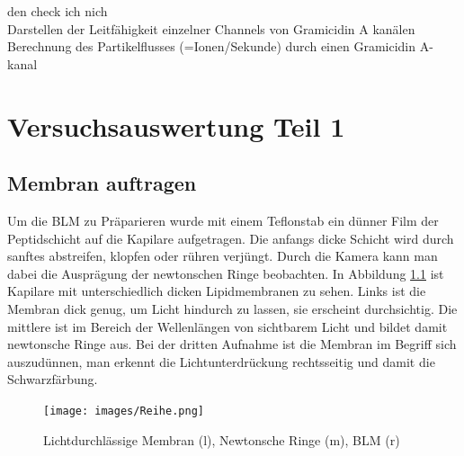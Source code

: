 \documentclass{include/thesisclass3}
\begin{document}
den check ich nich\\

Darstellen der Leitfähigkeit einzelner Channels von Gramicidin A kanälen\\

Berechnung des Partikelflusses (=Ionen/Sekunde) durch einen Gramicidin A-kanal



\chapter{Versuchsauswertung Teil 1}
\section{Membran auftragen}
Um die BLM zu Präparieren wurde mit einem Teflonstab ein dünner Film der Peptidschicht auf die Kapilare aufgetragen. Die anfangs dicke Schicht wird durch sanftes abstreifen, klopfen oder rühren verjüngt. Durch die Kamera kann man dabei die Ausprägung der newtonschen Ringe beobachten. In Abbildung \ref{Reihe} ist Kapilare mit unterschiedlich dicken Lipidmembranen zu sehen. Links ist die Membran dick genug, um Licht hindurch zu lassen, sie erscheint durchsichtig. Die mittlere ist im Bereich der Wellenlängen von sichtbarem Licht und bildet damit newtonsche Ringe aus. Bei der dritten Aufnahme ist die Membran im Begriff sich auszudünnen, man erkennt die Lichtunterdrückung rechtsseitig und damit die Schwarzfärbung.
\begin{figure}[ht]
	\begin{center}
		\texttt{[image: images/Reihe.png]}
		\caption{Lichtdurchlässige Membran (l), Newtonsche Ringe (m), BLM (r)}
		\label{Reihe}
	\end{center}
\end{figure}
\end{document}
